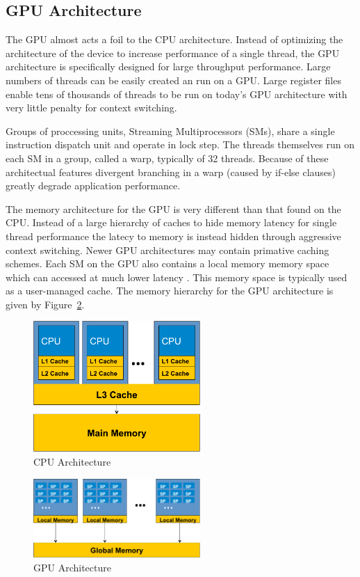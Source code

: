 \documentclass[journal]{IEEEtran}
\begin{document}
\subsection{GPU Architecture}
The GPU almost acts a foil to the CPU architecture.  Instead of optimizing the
architecture of the device to increase performance of a single thread, the GPU
architecture is specifically designed for large throughput performance.  Large
numbers of threads can be easily created an run on a GPU.  Large register files
enable tens of thousands of threads to be run on today's GPU architecture with
very little penalty for context switching.

Groups of proccessing units, Streaming Multiprocessors (SMs), share a single instruction
dispatch unit and operate in lock step.  The threads themselves run on each SM
in a group, called a warp, typically of 32 threads.  Because of these architectual
features divergent branching in a warp (caused by if-else clauses) greatly degrade application
performance.

The memory architecture for the GPU is very different than that found on the CPU. 
Instead of a large hierarchy of caches to hide memory latency for single thread
performance the latecy to memory is instead hidden through aggressive context
switching.  Newer GPU architectures may contain primative caching schemes.
Each SM on the GPU also contains a local memory memory space which can accessed 
at much lower latency .  This memory space is typically used as a user-managed
cache. The memory hierarchy for the GPU architecture is given by Figure~\ref{fig:gpu_arch}.

\begin{figure}[t]
\centering
\includegraphics[width=2.5in]{cpu_architecture}
\caption{CPU Architecture}
\label{fig:cpu_arch}
\end{figure}

\begin{figure}[t]
\centering
\includegraphics[width=2.5in]{gpu_architecture}
\caption{GPU Architecture}
\label{fig:gpu_arch}
\end{figure}
\end{document}
